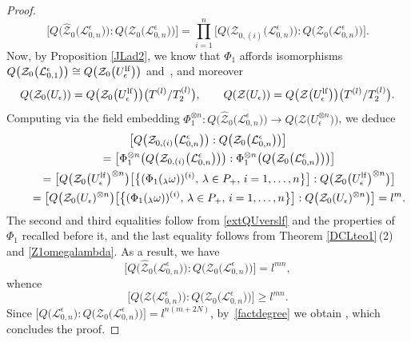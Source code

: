 \documentclass[10pt,a4paper]{amsart}
\numberwithin{equation}{section}
\theoremstyle{definition}
\newcommand{\e}{\epsilon}
\newcommand{\Ll}{{\mathcal L}}
\newcommand{\ra}{\rightarrow}
\begin{document}
\begin{proof}
\[\big[Q\big(\hat{\mathcal{Z}}_{0}\bigl(\Ll_{0,n}^\e\bigr)\big):Q\bigl(\mathcal{Z}_0\bigl(\Ll_{0,n}^\e\bigr)\bigr)\big] = \prod_{i=1}^n \bigl[Q\bigl(\mathcal{Z}_{0,(i)}\bigl(\Ll_{0,n}^\e\bigr)\bigr):Q\bigl(\mathcal{Z}_0\bigl(\Ll_{0,n}^\e\bigr)\bigr)\bigr].\]
Now, by Proposition \ref{JLad2}, we know that $\Phi_1$ affords isomorphisms $Q\bigl(\mathcal{Z}_0\bigl(\Ll_{0,1}^\e\bigr)\bigr)\cong Q\big(\mathcal{Z}_0\big(U_\e^{\rm lf}\big)\big)$ and~\smash{$Q(\mathcal{Z}\bigl(\Ll_{0,1}^\e\bigr))\cong Q\big(\mathcal{Z}\big(U_\e^{\rm lf}\big)\big)$}, and moreover
\begin{equation}\label{extQUverslf}
Q(\mathcal{Z}_0(U_\e)) = Q\big(\mathcal{Z}_0\big(U_\e^{\rm lf}\big)\big)\big(T^{(l)}/T_{2}^{(l)}\big), \qquad Q(\mathcal{Z}(U_\e)) = Q\big(\mathcal{Z}\big(U_\e^{\rm lf}\big)\big)\big(T^{(l)}/T_{2}^{(l)}\big).
\end{equation}
Computing via the field embedding $\Phi_1^{\otimes n}\colon Q\big(\hat{\mathcal{Z}}_{0}\bigl(\Ll_{0,n}^\e\bigr)\big) \ra Q\bigl(\mathcal{Z}\bigl(U_\e^{\otimes n}\bigr)\bigr)$, we deduce
\begin{gather*}
\bigl[Q\bigl(\mathcal{Z}_{0,(i)}\bigl(\Ll_{0,n}^\e\bigr)\bigr) :Q\bigl(\mathcal{Z}_0\bigl(\Ll_{0,n}^\e\bigr)\bigr)\bigr]\\
\qquad
 = \bigl[\Phi_1^{\otimes n}\bigl(Q\bigl(\mathcal{Z}_{0,(i)}\bigl(\Ll_{0,n}^\e\bigr)\bigr)\bigr):\Phi_1^{\otimes n}\bigl(Q\bigl(\mathcal{Z}_0\bigl(\Ll_{0,n}^\e\bigr)\bigr)\bigr)\bigr]\\
\qquad = \big[Q\big(\mathcal{Z}_0\big(U_\e^{\rm lf}\big)^{\otimes n}\big)\big[\big\{(\Phi_1({}_{\lambda}\omega))^{(i)},\,\lambda\in P_+, \, i=1,\dots,n\big\}\big]:Q\big(\mathcal{Z}_0\big(U_\e^{\rm lf}\big)^{\otimes n}\big)\big]\\
\qquad = \big[Q\big(\mathcal{Z}_0(U_\e)^{\otimes n}\big)\big[\big\{(\Phi_1({}_{\lambda}\omega))^{(i)},\,\lambda\in P_+, \, i=1,\dots,n\big\}\big]:Q\big(\mathcal{Z}_0(U_\e)^{\otimes n}\big)\big]=l^m.
\end{gather*}
The second and third equalities follow from \eqref{extQUverslf} and the properties of $\Phi_1$ recalled before it, and the last equality follows from Theorem \ref{DCLteo1}\,(2) and \eqref{Z1omegalambda}. As a result, we have
\[
\big[Q\big(\hat{\mathcal{Z}}_{0}\bigl(\Ll_{0,n}^\e\bigr)\big):Q\bigl(\mathcal{Z}_0\bigl(\Ll_{0,n}^\e\bigr)\bigr)\big]=l^{mn},
\]
 whence \[
 \bigl[Q\bigl(\mathcal{Z}\bigl(\Ll_{0,n}^\e\bigr)\bigr):Q\bigl(\mathcal{Z}_0\bigl(\Ll_{0,n}^\e\bigr)\bigr)\bigr]\geq l^{mn}.
 \]
Since $\bigl[Q\bigl(\Ll_{0,n}^\e\bigr):Q\bigl(\mathcal{Z}_0\bigl(\Ll_{0,n}^\e\bigr)\bigr)\bigr] = l^{n(m+2N)}$, by~\eqref{factdegree} we obtain , which concludes the proof.
\end{proof}
\end{document}
